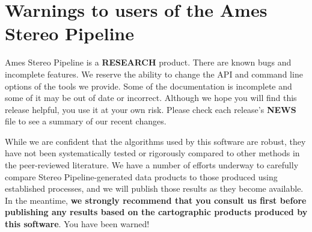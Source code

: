\section{Warnings to users of the Ames Stereo Pipeline}

Ames Stereo Pipeline is a {\bf RESEARCH} product. There are known bugs
and incomplete features. We reserve the ability to change the API and
command line options of the tools we provide. Some of the
documentation is incomplete and some of it may be out of date or
incorrect.  Although we hope you will find this release helpful, you
use it at your own risk. Please check each release's {\bf NEWS} file
to see a summary of our recent changes.

While we are confident that the algorithms used by this software are
robust, they have not been systematically tested or rigorously
compared to other methods in the peer-reviewed literature. We have a
number of efforts underway to carefully compare Stereo
Pipeline-generated data products to those produced using established
processes, and we will publish those results as they become available.
In the meantime, {\bf we strongly recommend that you consult us first
  before publishing any results based on the cartographic products
  produced by this software}. You have been warned!

